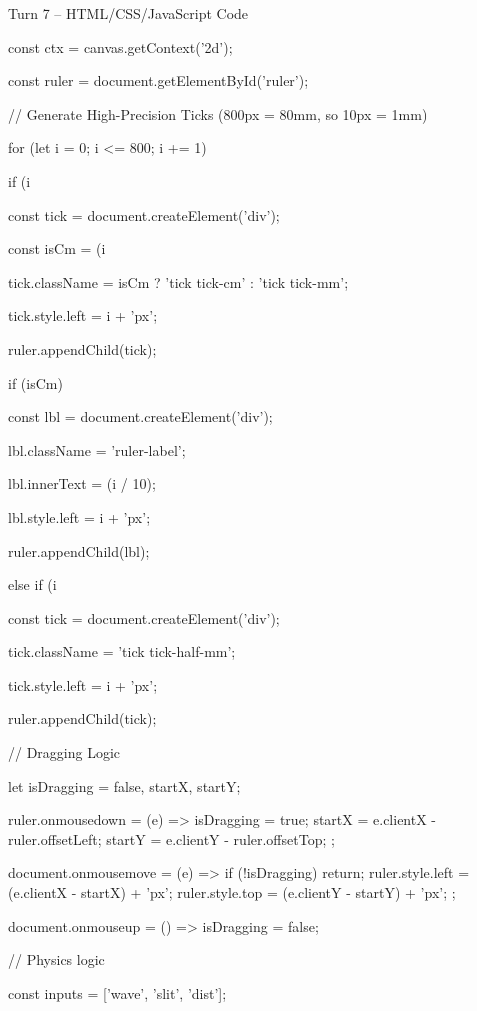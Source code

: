 \documentclass[10pt,a4paper]{article}
\begin{document}
\begin{htmlcodebox}{Turn 7 -- HTML/CSS/JavaScript Code}
{{{{{const ctx = canvas.getContext('2d');

const ruler = document.getElementById('ruler');

// Generate High-Precision Ticks (800px = 80mm, so 10px = 1mm)

for (let i = 0; i <= 800; i += 1) {

    if (i %

        const tick = document.createElement('div');

        const isCm = (i %

        tick.className = isCm ? 'tick tick-cm' : 'tick tick-mm';

        tick.style.left = i + 'px';

        ruler.appendChild(tick);

        if (isCm) {

            const lbl = document.createElement('div');

            lbl.className = 'ruler-label';


            lbl.innerText = (i / 10);

            lbl.style.left = i + 'px';

            ruler.appendChild(lbl);

        }

    } else if (i %

        const tick = document.createElement('div');

        tick.className = 'tick tick-half-mm';

        tick.style.left = i + 'px';

        ruler.appendChild(tick);

    }

}

// Dragging Logic

let isDragging = false, startX, startY;

ruler.onmousedown = (e) => { isDragging = true; startX = e.clientX - ruler.offsetLeft; startY = e.clientY - ruler.offsetTop; };

document.onmousemove = (e) => { if (!isDragging) return; ruler.style.left = (e.clientX - startX) + 'px'; ruler.style.top = (e.clientY - startY) + 'px'; };

document.onmouseup = () => isDragging = false;

// Physics logic

const inputs = ['wave', 'slit', 'dist'];

}}}
\end{htmlcodebox}
\end{document}
